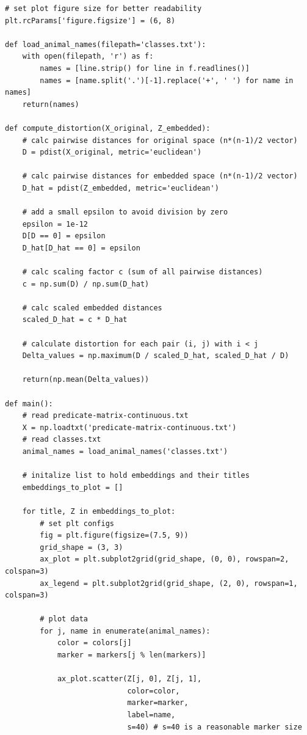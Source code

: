\documentclass{article}
\begin{document}
{\begin{lstlisting}
# set plot figure size for better readability 
plt.rcParams['figure.figsize'] = (6, 8)

def load_animal_names(filepath='classes.txt'):
    with open(filepath, 'r') as f:
        names = [line.strip() for line in f.readlines()]
        names = [name.split('.')[-1].replace('+', ' ') for name in names]
    return(names)

def compute_distortion(X_original, Z_embedded):
    # calc pairwise distances for original space (n*(n-1)/2 vector)
    D = pdist(X_original, metric='euclidean')

    # calc pairwise distances for embedded space (n*(n-1)/2 vector)
    D_hat = pdist(Z_embedded, metric='euclidean')
    
    # add a small epsilon to avoid division by zero
    epsilon = 1e-12
    D[D == 0] = epsilon
    D_hat[D_hat == 0] = epsilon
    
    # calc scaling factor c (sum of all pairwise distances)
    c = np.sum(D) / np.sum(D_hat)
    
    # calc scaled embedded distances
    scaled_D_hat = c * D_hat
    
    # calculate distortion for each pair (i, j) with i < j
    Delta_values = np.maximum(D / scaled_D_hat, scaled_D_hat / D)
    
    return(np.mean(Delta_values))

def main():
    # read predicate-matrix-continuous.txt
    X = np.loadtxt('predicate-matrix-continuous.txt')
    # read classes.txt
    animal_names = load_animal_names('classes.txt')
    
    # initalize list to hold embeddings and their titles
    embeddings_to_plot = []
    
    for title, Z in embeddings_to_plot:
        # set plt configs
        fig = plt.figure(figsize=(7.5, 9))
        grid_shape = (3, 3)
        ax_plot = plt.subplot2grid(grid_shape, (0, 0), rowspan=2, colspan=3)
        ax_legend = plt.subplot2grid(grid_shape, (2, 0), rowspan=1, colspan=3)
        
        # plot data
        for j, name in enumerate(animal_names):
            color = colors[j]
            marker = markers[j % len(markers)]
            
            ax_plot.scatter(Z[j, 0], Z[j, 1], 
                            color=color, 
                            marker=marker, 
                            label=name, 
                            s=40) # s=40 is a reasonable marker size
        

\end{lstlisting}}
\end{document}

